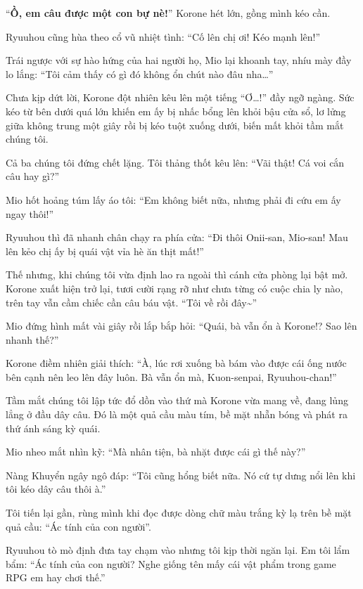 \documentclass[../main.tex]{subfiles}
\begin{document}

``\textbf{Ồ, em câu được một con bự nè!}'' Korone hét lớn, gồng mình kéo cần.

Ryuuhou cũng hùa theo cổ vũ nhiệt tình: ``Cố lên chị ơi! Kéo mạnh lên!''

Trái ngược với sự hào hứng của hai người họ, Mio lại khoanh tay, nhíu mày đầy lo lắng: ``Tôi cảm thấy có gì đó không ổn chút nào đâu nha\dots''


Chưa kịp dứt lời, Korone đột nhiên kêu lên một tiếng ``Ơ\dots!'' đầy ngỡ ngàng. Sức kéo từ bên dưới quá lớn khiến em ấy bị nhấc bổng lên khỏi bậu cửa sổ, lơ lửng giữa không trung một giây rồi bị kéo tuột xuống dưới, biến mất khỏi tầm mắt chúng tôi.

Cả ba chúng tôi đứng chết lặng. Tôi thảng thốt kêu lên: ``Vãi thật! Cá voi cắn câu hay gì?''

Mio hốt hoảng túm lấy áo tôi: ``Em không biết nữa, nhưng phải đi cứu em ấy ngay thôi!''

Ryuuhou thì đã nhanh chân chạy ra phía cửa: ``Đi thôi Onii-san, Mio-san! Mau lên kẻo chị ấy bị quái vật vỉa hè ăn thịt mất!''

Thế nhưng, khi chúng tôi vừa định lao ra ngoài thì cánh cửa phòng lại bật mở. Korone xuất hiện trở lại, tươi cười rạng rỡ như chưa từng có cuộc chia ly nào, trên tay vẫn cầm chiếc cần câu báu vật. ``Tôi về rồi đây\~{}''


Mio đứng hình mất vài giây rồi lắp bắp hỏi: ``Quái, bà vẫn ổn à Korone!? Sao lên nhanh thế?''

Korone điềm nhiên giải thích: ``À, lúc rơi xuống bà bám vào được cái ống nước bên cạnh nên leo lên đây luôn. Bà vẫn ổn mà, Kuon-senpai, Ryuuhou-chan!''

Tầm mắt chúng tôi lập tức đổ dồn vào thứ mà Korone vừa mang về, đang lủng lẳng ở đầu dây câu. Đó là một quả cầu màu tím, bề mặt nhẵn bóng và phát ra thứ ánh sáng kỳ quái.

Mio nheo mắt nhìn kỹ: ``Mà nhân tiện, bà nhặt được cái gì thế này?''

Nàng Khuyển ngây ngô đáp: ``Tôi cũng hổng biết nữa. Nó cứ tự dưng nổi lên khi tôi kéo dây câu thôi à.''


Tôi tiến lại gần, rùng mình khi đọc được dòng chữ màu trắng kỳ lạ trên bề mặt quả cầu: ``Ác tính của con người''.

Ryuuhou tò mò định đưa tay chạm vào nhưng tôi kịp thời ngăn lại. Em tôi lẩm bẩm: ``Ác tính của con người? Nghe giống tên mấy cái vật phẩm trong game RPG em hay chơi thế.''
\end{document}
